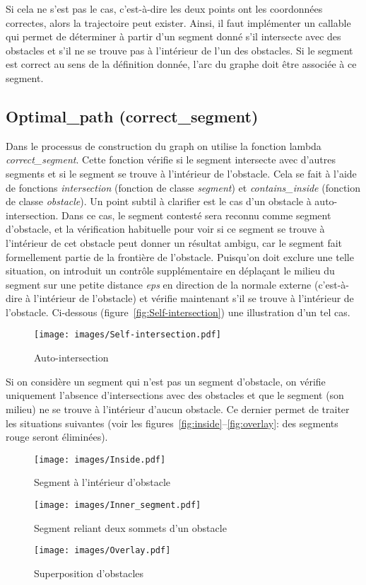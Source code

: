 \documentclass[12pt]{article}
\begin{document}
	Si cela ne s'est pas le cas, c'est-à-dire les deux points ont les coordonnées correctes, alors la trajectoire peut exister. Ainsi, il faut implémenter un callable qui permet de déterminer à partir d'un segment donné s'il intersecte avec des obstacles et s'il ne se trouve pas à l'intérieur de l'un des obstacles. Si le segment est correct au sens de la définition donnée, l'arc du graphe doit être associée à ce segment.
	
	\subsection{Optimal\_path (correct\_segment)}
	Dans le processus de construction du graph on utilise la fonction lambda \textit{correct\_segment}. Cette fonction vérifie si le segment intersecte avec d'autres segments et si le segment se trouve à l'intérieur de l'obstacle. Cela se fait à l'aide de fonctions \textit{intersection} (fonction de classe \textit{segment}) et \textit{contains\_inside} (fonction de classe \textit{obstacle}). Un point subtil à clarifier est le cas d'un obstacle à auto-intersection. Dans ce cas, le segment contesté sera reconnu comme segment d'obstacle, et la vérification habituelle pour voir si ce segment se trouve à l'intérieur de cet obstacle peut donner un résultat ambigu, car le segment fait formellement partie de la frontière de l'obstacle. Puisqu'on doit exclure une telle situation, on introduit un contrôle supplémentaire en déplaçant le milieu du segment sur une petite distance \textit{eps} en direction de la normale externe (c'est-à-dire à l'intérieur de l'obstacle) et vérifie maintenant s'il se trouve à l'intérieur de l'obstacle. Ci-dessous (figure~\eqref{fig:Self-intersection}) une illustration d'un tel cas. 
	\begin{figure}[H]
		\centering
		\texttt{[image: images/Self-intersection.pdf]}
		\caption{Auto-intersection}
		\label{fig:Self-intersection}
	\end{figure}
	
	Si on considère un segment qui n'est pas un segment d'obstacle, on vérifie uniquement l'absence d'intersections avec des obstacles et que le segment (son milieu) ne se trouve à l'intérieur d'aucun obstacle. Ce dernier permet de traiter les situations suivantes (voir les figures~\eqref{fig:inside}--\eqref{fig:overlay}: des segments rouge seront éliminées). 
	\begin{figure}[H]
		\centering
		\texttt{[image: images/Inside.pdf]}
		\caption{Segment à l'intérieur d'obstacle}
		\label{fig:inside}
	\end{figure}
	\begin{figure}[H]
		\centering
		\texttt{[image: images/Inner\_segment.pdf]}
		\caption{Segment reliant deux sommets d'un obstacle}
		\label{fig:corner-to-corner}
	\end{figure}
	\begin{figure}[H]
		\centering
		\texttt{[image: images/Overlay.pdf]}
		\caption{Superposition d'obstacles}
		\label{fig:overlay}
	\end{figure}
	
\end{document}
